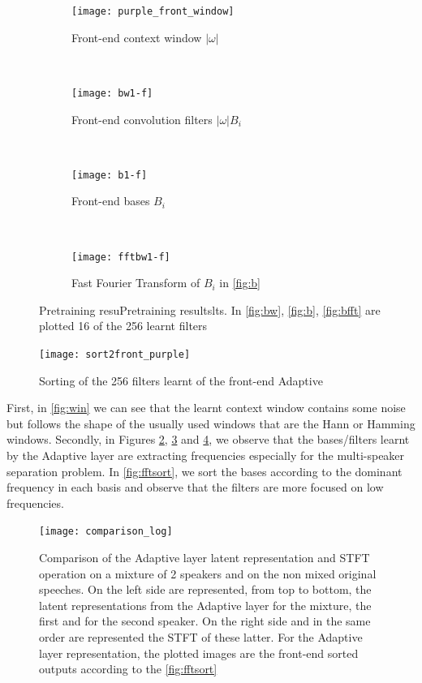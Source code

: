 \documentclass[master, tikz, final,11pt, dvipdfmx]{iscs-thesis}
\begin{document}
\begin{figure}[h]
\centering
\begin{subfigure}[b]{0.45\textwidth}
\texttt{[image: purple\_front\_window]}
\caption{Front-end context window $|\omega|$}
\label{fig:win} 
\end{subfigure}
~
\begin{subfigure}[b]{0.45\textwidth}
\texttt{[image: bw1-f]}
\captionsetup{justification=centering}
\caption{Front-end convolution filters $|\omega| B_i$}
\label{fig:bw} 
\end{subfigure}
\\
\begin{subfigure}[b]{0.45\textwidth}
\texttt{[image: b1-f]}
\captionsetup{justification=centering}
\caption{Front-end bases $B_i$}
\label{fig:b} 
\end{subfigure}
~
\begin{subfigure}[b]{0.45\textwidth}
\texttt{[image: fftbw1-f]}
\captionsetup{justification=centering}
\caption{Fast Fourier Transform of $B_i$ in \autoref{fig:b}}
\label{fig:bfft} 
\end{subfigure}

\captionsetup{justification=centering}
\caption[Adaptive layer pretraining results]{Pretraining resuPretraining resultslts. In \autoref{fig:bw}, \autoref{fig:b}, \autoref{fig:bfft} are plotted 16 of the 256 learnt filters}
\label{fig:pretrainingadapt} 

\end{figure}

\begin{figure}[h]
\centering
\texttt{[image: sort2front\_purple]}
\captionsetup{justification=centering}
\caption{Sorting of the 256 filters learnt of the front-end Adaptive}
\label{fig:fftsort} 
\end{figure}


First, in \autoref{fig:win} we can see that the learnt context window contains some noise but follows the shape of the usually used windows that are the Hann or Hamming windows.
Secondly, in Figures \ref{fig:bw}, \ref{fig:b} and \ref{fig:bfft}, we observe that the bases/filters learnt by the Adaptive layer are extracting frequencies especially for the multi-speaker separation problem. In \autoref{fig:fftsort}, we sort the bases according to the dominant frequency in each basis and observe that the filters are more focused on low frequencies.

\begin{figure}[h]
\centering
\texttt{[image: comparison\_log]}
\caption[Comparison of the Adaptive layer latent representation and STFT operation on a mixture of 2 speakers and on the non mixed original speeches]{Comparison of the Adaptive layer latent representation and STFT operation on a mixture of 2 speakers and on the non mixed original speeches. On the left side are represented, from top to  bottom, the latent representations from the Adaptive layer for the mixture, the first and for the second speaker. On the right side and in the same order are represented the STFT of these latter. For the Adaptive layer representation, the plotted images are the front-end sorted outputs according to the \autoref{fig:fftsort}}
\label{fig:comparison} 
\end{figure}
\end{document}
